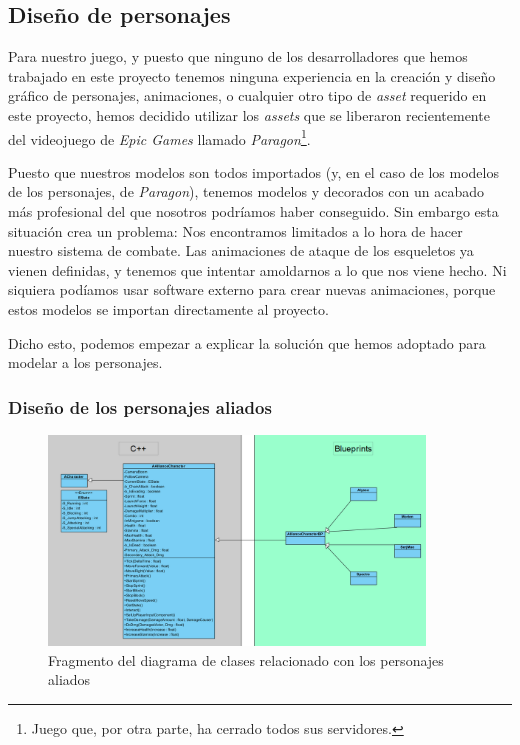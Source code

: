 \subsection{Diseño de personajes}
Para nuestro juego, y puesto que ninguno de los desarrolladores que hemos trabajado en este proyecto tenemos ninguna experiencia en la creación y diseño gráfico de personajes, animaciones, o cualquier otro tipo de \textit{asset} requerido en este proyecto, hemos decidido utilizar los \textit{assets} que se liberaron recientemente del videojuego de \textit{Epic Games} llamado \textit{Paragon}\footnote{Juego que, por otra parte, ha cerrado todos sus servidores.}.


Puesto que nuestros modelos son todos importados (y, en el caso de los modelos de los personajes, de \textit{Paragon}), tenemos modelos y decorados con un acabado más profesional del que nosotros podríamos haber conseguido. Sin embargo esta situación crea un problema: Nos encontramos limitados a lo hora de hacer nuestro sistema de combate. Las animaciones de ataque de los esqueletos ya vienen definidas, y tenemos que intentar amoldarnos a lo que nos viene hecho. Ni siquiera podíamos usar software externo para crear nuevas animaciones, porque estos modelos se importan directamente al proyecto.


Dicho esto, podemos empezar a explicar la solución que hemos adoptado para modelar a los personajes.

\subsubsection{Diseño de los personajes aliados}

\begin{figure}[H]
  \centering
  \includegraphics[width=10cm]{./images/Classes_Aliados.png}
  \caption{Fragmento del diagrama de clases relacionado con los personajes aliados}
  \label{ClassesAllies}
\end{figure}

